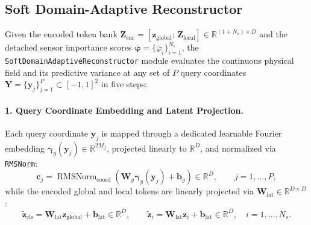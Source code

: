 \subsection{Soft Domain-Adaptive Reconstructor}
\label{subsec:bg_glu_reconstructor}

Given the encoded token bank $\mathbf{Z}_{\text{enc}} = [\mathbf{z}_{\text{global}};\, \mathbf{Z}_{\text{local}}] \in \mathbb{R}^{(1 + N_s) \times D}$ and the detached sensor importance scores $\bar{\boldsymbol{\varphi}} = \{\bar{\varphi}_i\}_{i=1}^{N_s}$, the \texttt{SoftDomainAdaptiveReconstructor} module evaluates the continuous physical field and its predictive variance at any set of $P$ query coordinates $\mathbf{Y} = \{\mathbf{y}_j\}_{j=1}^P \subset [-1, 1]^2$ in five steps:

\paragraph{1. Query Coordinate Embedding and Latent Projection.}
Each query coordinate $\mathbf{y}_j$ is mapped through a dedicated learnable Fourier embedding $\boldsymbol{\gamma}_y(\mathbf{y}_j) \in \mathbb{R}^{2M_f}$, projected linearly to $\mathbb{R}^D$, and normalized via \texttt{RMSNorm}:
\begin{equation}
    \mathbf{c}_j = \operatorname{RMSNorm}_{\text{coord}}\!\left(\mathbf{W}_y \boldsymbol{\gamma}_y(\mathbf{y}_j) + \mathbf{b}_y\right) \in \mathbb{R}^D, \qquad j = 1, \dots, P,
    \label{eq:bg_glu_query_coord}
\end{equation}
while the encoded global and local tokens are linearly projected via $\mathbf{W}_{\text{lat}} \in \mathbb{R}^{D \times D}$:
\begin{equation}
    \tilde{\mathbf{z}}_{\text{cls}} = \mathbf{W}_{\text{lat}} \mathbf{z}_{\text{global}} + \mathbf{b}_{\text{lat}} \in \mathbb{R}^D, \qquad \tilde{\mathbf{z}}_i = \mathbf{W}_{\text{lat}} \mathbf{z}_i + \mathbf{b}_{\text{lat}} \in \mathbb{R}^D, \quad i = 1, \dots, N_s.
    \label{eq:bg_glu_lat_proj}
\end{equation}

